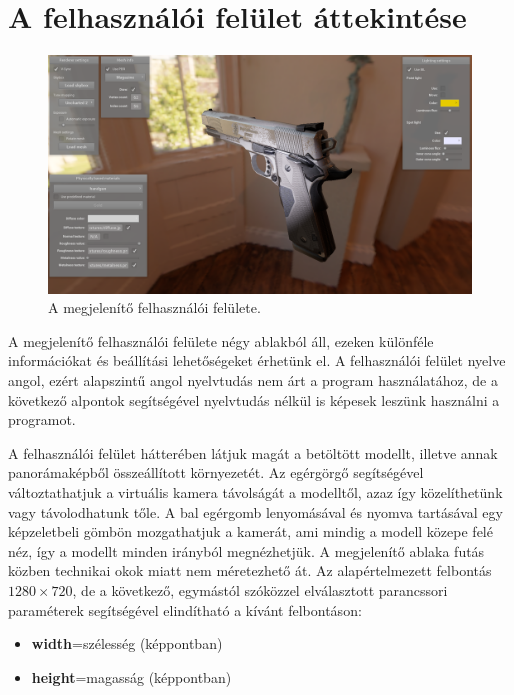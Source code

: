 \section{A felhasználói felület áttekintése}

\begin{figure}[!ht]
    \centering
    \includegraphics[width=1.0\textwidth]{images/screenshot.png}
    \caption{A megjelenítő felhasználói felülete.}
\end{figure}

A megjelenítő felhasználói felülete négy ablakból áll, ezeken különféle információkat és beállítási lehetőségeket érhetünk el. A felhasználói felület nyelve angol, ezért alapszintű angol nyelvtudás nem árt a program használatához, de a következő alpontok segítségével nyelvtudás nélkül is képesek leszünk használni a programot.

A felhasználói felület hátterében látjuk magát a betöltött modellt, illetve annak panorámaképből összeállított környezetét. Az egérgörgő segítségével változtathatjuk a virtuális kamera távolságát a modelltől, azaz így közelíthetünk vagy távolodhatunk tőle. A bal egérgomb lenyomásával és nyomva tartásával egy képzeletbeli gömbön mozgathatjuk a kamerát, ami mindig a modell közepe felé néz, így a modellt minden irányból megnézhetjük. A megjelenítő ablaka futás közben technikai okok miatt nem méretezhető át. Az alapértelmezett felbontás \(1280 \times 720\), de a következő, egymástól szóközzel elválasztott parancssori paraméterek segítségével elindítható a kívánt felbontáson:

\begin{itemize}[noitemsep]
\item \textbf{width}=szélesség (képpontban)
\item \textbf{height}=magasság (képpontban)
\end{itemize}

